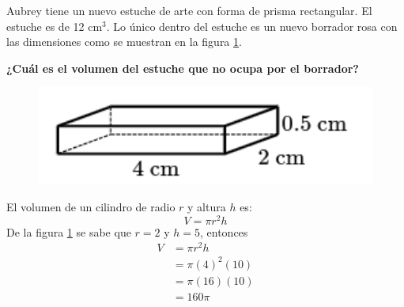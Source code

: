 \question[10] Aubrey tiene un nuevo estuche de arte con forma de prisma rectangular.
El estuche es de 12 cm$^3$. Lo único dentro del estuche es un nuevo borrador rosa con las dimensiones
como se muestran en la figura \ref{fig:vol_area_03}.

\textbf{¿Cuál es el volumen del estuche que no ocupa por el borrador?}\\

\begin{minipage}{0.3\linewidth}
    \begin{figure}[H]
        \begin{center}
            \includegraphics[width=1\textwidth]{../images/vol_area_03}
        \end{center}
        \caption{}
        \label{fig:vol_area_03}
    \end{figure}
\end{minipage}
\begin{minipage}{0.7\linewidth}
    \begin{solutionbox}{6cm}        El volumen de un cilindro de radio $r$ y altura $h$ es:
        \begin{equation*}
            V = \pi r^2 h
        \end{equation*}
        De la figura \ref{fig:vol_area_03} se sabe que $r=2$ y $h=5$, entonces
        \begin{equation*}
            \begin{split}
                V & = \pi r^2 h\\
                & = \pi (4)^2 (10)\\
                & = \pi (16) (10)\\
                & = 160\pi
            \end{split}
        \end{equation*}
    \end{solutionbox}
\end{minipage}